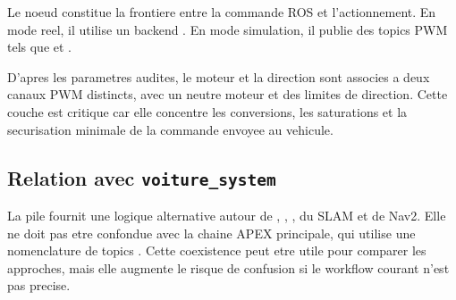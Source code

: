 Le noeud  constitue la frontiere entre la commande ROS et l'actionnement. En mode reel, il utilise un backend . En mode simulation, il publie des topics PWM tels que  et .

D'apres les parametres audites, le moteur et la direction sont associes a deux canaux PWM distincts, avec un neutre moteur et des limites de direction. Cette couche est critique car elle concentre les conversions, les saturations et la securisation minimale de la commande envoyee au vehicule.

\subsection{Relation avec \texttt{voiture\_system}}

La pile  fournit une logique alternative autour de , , , du SLAM et de Nav2. Elle ne doit pas etre confondue avec la chaine APEX principale, qui utilise une nomenclature de topics . Cette coexistence peut etre utile pour comparer les approches, mais elle augmente le risque de confusion si le workflow courant n'est pas precise.
